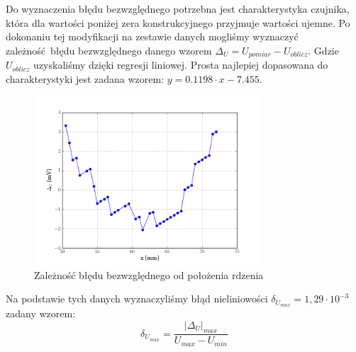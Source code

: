 \documentclass[a4paper, 12pt, titlepage]{article}
\begin{document}
				Do wyznaczenia błędu bezwzględnego potrzebna jest charakterystyka czujnika, która dla wartości poniżej zera konstrukcyjnego przyjmuje wartości ujemne. Po dokonaniu tej modyfikacji na zestawie danych mogliśmy wyznaczyć zależność błędu bezwzględnego danego wzorem $\Delta_U = U_{pomiar} - U_{oblicz}$. Gdzie $U_{oblicz}$ uzyskaliśmy dzięki regresji liniowej. Prosta najlepiej dopasowana do charakterystyki jest zadana wzorem: $y = 0.1198 \cdot x -7.455$.
				\begin{figure}[H]
					\centering
					\includegraphics[width=0.75\textwidth]{./img/Uac_blad.png}
					\caption{\small{Zależność błędu bezwzględnego od położenia rdzenia}}
				\end{figure} \noindent
				Na podstawie tych danych wyznaczyliśmy błąd nieliniowości $\delta_{U_{max}} = 1,29\cdot10^{-3}$ zadany wzorem:
				\begin{equation}
					\delta_{U_{max}} = \frac{|\Delta_U|_{max}}{U_{max}-U_{min}}
				\end{equation}
\end{document}

